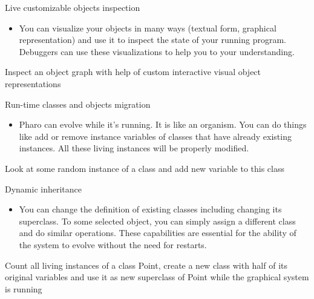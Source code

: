 \documentclass{beamer}
\begin{document}
\begin{frame}{Live customizable objects inspection}
\begin{itemize}
    \item You can visualize your objects in many ways (textual form, graphical representation) and use it to inspect the state of your running program. Debuggers can use these visualizations to help you to your understanding.
\end{itemize}
\begin{block}{}
Inspect an object graph with help of custom interactive visual object representations    
\end{block}
\end{frame}

\begin{frame}{Run-time classes and objects migration}
\begin{itemize}
    \item Pharo can evolve while it’s running. It is like an organism. You can do things like add or remove instance variables of classes that have already existing instances. All these living instances will be properly modified.
\end{itemize}
\begin{block}{}
Look at some random instance of a class and add new variable to this class
\end{block}
\end{frame}

\begin{frame}{Dynamic inheritance}

\begin{itemize}
    \item You can change the definition of existing classes including changing its superclass. To some selected object, you can simply assign a different class and do similar operations. These capabilities are essential for the ability of the system to evolve without the need for restarts.
\end{itemize}
\begin{block}{}
Count all living instances of a class Point, create a new class with half of its original variables and use it as new superclass of Point while the graphical system is running
\end{block}

\end{frame}
\end{document}
